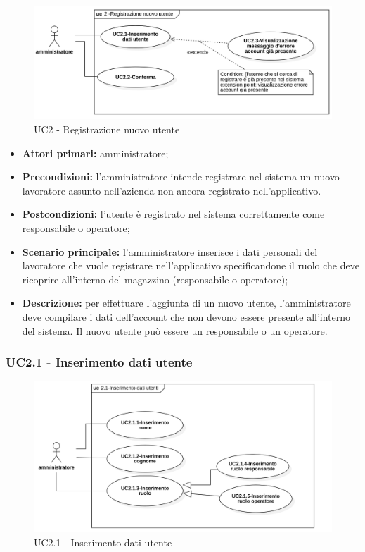 \begin{figure}[H]
	\centering
	\includegraphics[scale=0.52]{res/images/uc2.png}
	\caption{UC2 - Registrazione nuovo utente}
\end{figure}
\begin{itemize}
	\item 	\textbf{Attori primari:} amministratore;
	\item 	\textbf{Precondizioni:}	l'amministratore intende registrare nel sistema un nuovo lavoratore assunto nell'azienda non ancora registrato nell'applicativo.
	\item 	\textbf{Postcondizioni:} l'utente è registrato nel sistema correttamente come responsabile o operatore;
	\item 	\textbf{Scenario principale:} l'amministratore inserisce i dati personali del lavoratore che vuole registrare nell'applicativo specificandone il ruolo che deve ricoprire all'interno del magazzino (responsabile o operatore);
	\item 	\textbf{Descrizione:} per effettuare l'aggiunta di un nuovo utente, l'amministratore deve compilare i dati dell'account che non devono essere presente all'interno del sistema. Il nuovo utente può essere un responsabile o un operatore.

\end{itemize}

\subsubsection{UC2.1 - Inserimento dati utente}

\begin{figure}[H]
	\centering
	\includegraphics[scale=0.52]{res/images/uc2-1.png}
	\caption{UC2.1 - Inserimento dati utente}
\end{figure}

